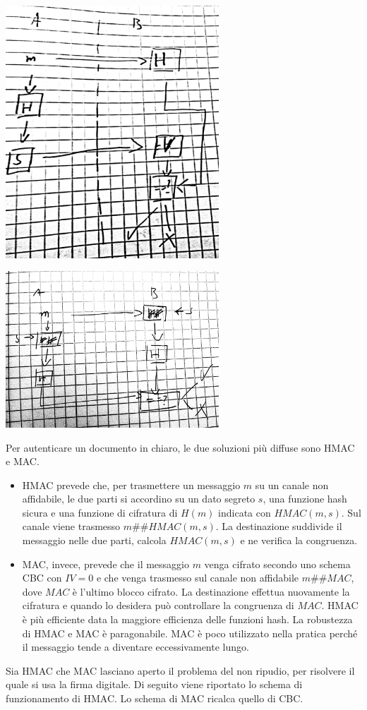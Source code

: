 \documentclass[answers, a4paper, 11pt]{exam}
\newcommand{\concat}{\#\#}
\begin{document}
\begin{questions}
\begin{parts}
\begin{solution}
\includegraphics[width=0.6\textwidth]{authsign}


\includegraphics[width=0.6\textwidth]{authhash}

Per autenticare un documento in chiaro, le due soluzioni più diffuse sono HMAC e MAC.
	\begin{itemize}
		\item HMAC prevede che, per trasmettere un messaggio $m$ su un canale non affidabile, le due parti si accordino su un dato segreto $s$, una funzione hash sicura e una funzione di cifratura di $H(m)$ indicata con $HMAC(m, s)$.
Sul canale viene trasmesso $m \concat HMAC(m, s)$.
La destinazione suddivide il messaggio nelle due parti, calcola $HMAC(m, s)$ e ne verifica la congruenza.
\item MAC, invece, prevede che il messaggio $m$ venga cifrato secondo uno schema CBC con $IV = 0$ e che venga trasmesso sul canale non affidabile $m \concat MAC$, dove $MAC$ è l'ultimo blocco cifrato.
La destinazione effettua nuovamente la cifratura e quando lo desidera può controllare la congruenza di $MAC$.
HMAC è più efficiente data la maggiore efficienza delle funzioni hash.
La robustezza di HMAC e MAC è paragonabile.
MAC è poco utilizzato nella pratica perché il messaggio tende a diventare eccessivamente lungo.
	\end{itemize}
Sia HMAC che MAC lasciano aperto il problema del non ripudio, per risolvere il quale si usa la firma digitale.
Di seguito viene riportato lo schema di funzionamento di HMAC.
Lo schema di MAC ricalca quello di CBC.


\end{solution}
\end{parts}
\end{questions}
\end{document}
